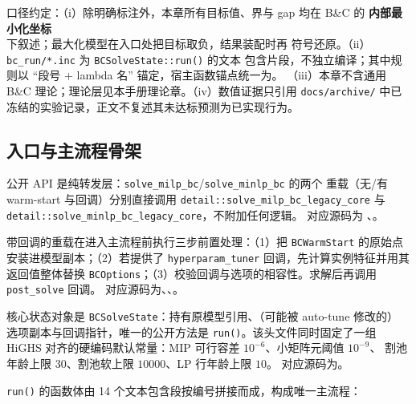 \begin{boundarynote}
口径约定：（i）除明确标注外，本章所有目标值、界与 gap 均在 B\&C 的
\textbf{内部最小化坐标}下叙述；最大化模型在入口处把目标取负，结果装配时再
符号还原。（ii）\texttt{bc\_run/*.inc} 为 \texttt{BCSolveState::run()} 的文本
包含片段，不独立编译；其中规则以 ``段号 + lambda 名'' 锚定，宿主函数锚点统一为。
（iii）本章不含通用 B\&C 理论；理论层见本手册理论章。（iv）数值证据只引用
\texttt{docs/archive/} 中已冻结的实验记录，正文不复述其未达标预测为已实现行为。
\end{boundarynote}

\subsection{入口与主流程骨架}\label{subsec:milpbc-entry}

公开 API 是纯转发层：\texttt{solve\_milp\_bc}/\texttt{solve\_minlp\_bc} 的两个
重载（无/有 warm-start 与回调）分别直接调用
\texttt{detail::solve\_milp\_bc\_legacy\_core} 与
\texttt{detail::solve\_minlp\_bc\_legacy\_core}，不附加任何逻辑。
对应源码为 、。

带回调的重载在进入主流程前执行三步前置处理：（1）把
\texttt{BCWarmStart} 的原始点安装进模型副本；（2）若提供了
\texttt{hyperparam\_tuner} 回调，先计算实例特征并用其返回值整体替换
\texttt{BCOptions}；（3）校验回调与选项的相容性。求解后再调用
\texttt{post\_solve} 回调。
对应源码为、、。

核心状态对象是 \texttt{BCSolveState}：持有原模型引用、（可能被 auto-tune 修改的）
选项副本与回调指针，唯一的公开方法是 \texttt{run()}。该头文件同时固定了一组
HiGHS 对齐的硬编码默认常量：MIP 可行容差 $10^{-6}$、小矩阵元阈值 $10^{-9}$、
割池年龄上限 $30$、割池软上限 $10000$、LP 行年龄上限 $10$。
对应源码为。

\texttt{run()} 的函数体由 14 个文本包含段按编号拼接而成，构成唯一主流程：

